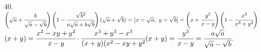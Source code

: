 40. $\left(\sqrt{a}+\cfrac{b}{\sqrt{a}-\sqrt{b}}\right)\left(1-\cfrac{\sqrt{b^3}}{a\sqrt{a}+b\sqrt{b}}\right)
(\sqrt{a}+\sqrt{b})=[x=\sqrt{a},\ y=\sqrt{b}]=\left(x+\cfrac{y^2}{x-y}\right)\left(1-\cfrac{x^3}{x^3+y^3}\right)$\\$(x+y)=
\cfrac{x^2-xy+y^2}{x-y}\cdot\cfrac{x^3+y^3-x^3}{(x+y)(x^2-xy+y^2}(x+y)=\cfrac{y^3}{x-y}=\cfrac{a\sqrt{a}}{\sqrt{a}-\sqrt{b}}.$\\
